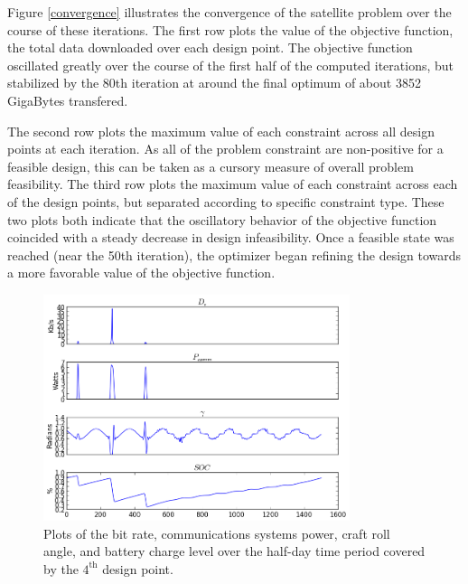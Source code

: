 \documentclass[]{aiaa-tc} %
\begin{document}
        Figure \ref{convergence} illustrates the convergence of the satellite problem over the course of
        these iterations. The first row plots the
        value of the objective function, the total data downloaded over each design point. The objective
        function oscillated greatly over the course of the first half of the computed iterations, but
        stabilized by the 80th iteration at around the final optimum of about 3852 GigaBytes transfered.

        The second row plots the maximum value of each constraint across all design points at
        each iteration. As all of the problem constraint are non-positive for a feasible design,
        this can be taken as a cursory measure of overall problem feasibility.
        The third row plots the maximum value of each constraint across each of the design points,
        but separated according to specific constraint type. These two plots both indicate that the
        oscillatory behavior of the objective function coincided with a steady decrease in design
        infeasibility. Once a feasible state was reached (near the 50th iteration), the optimizer
        began refining the design towards a more favorable value of the objective function.

        \begin{figure}[!htb]
        \centering
        \includegraphics[width=0.8\textwidth]{images/pt_3_data}
        \caption[width=0.4\textwidth]{Plots of the bit rate, communications systems power, craft roll angle,
        and battery charge level over the half-day time period covered by the $4^{\textrm{th}}$ design point.
        \label{pt3_data_results}
        }
        \end{figure}
\end{document}
